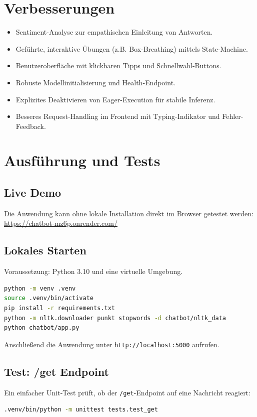 \documentclass[a4paper,11pt]{article}
\begin{document}
\section{Verbesserungen}
\begin{itemize}
  \item Sentiment-Analyse zur empathischen Einleitung von Antworten.
  \item Gef\"uhrte, interaktive \"Ubungen (z.B. Box-Breathing) mittels State-Machine.
  \item Benutzeroberfl\"ache mit klickbaren Tipps und Schnellwahl-Buttons.
  \item Robuste Modellinitialisierung und Health-Endpoint.
  \item Explizites Deaktivieren von Eager-Execution f\"ur stabile Inferenz.
  \item Besseres Request-Handling im Frontend mit Typing-Indikator und Fehler-Feedback.
\end{itemize}

\section{Ausf\"uhrung und Tests}
\subsection{Live Demo}
Die Anwendung kann ohne lokale Installation direkt im Browser getestet werden: \\
\href{https://chatbot-mz6p.onrender.com/}{https://chatbot-mz6p.onrender.com/}

\subsection{Lokales Starten}
Voraussetzung: Python 3.10 und eine virtuelle Umgebung.
\begin{lstlisting}[style=shared,language=bash]
python -m venv .venv
source .venv/bin/activate
pip install -r requirements.txt
python -m nltk.downloader punkt stopwords -d chatbot/nltk_data
python chatbot/app.py
\end{lstlisting}
Anschlie\ss end die Anwendung unter \texttt{http://localhost:5000} aufrufen.

\subsection{Test: /get Endpoint}
Ein einfacher Unit-Test pr\"uft, ob der \texttt{/get}-Endpoint auf eine Nachricht reagiert:
\begin{lstlisting}[style=shared,language=bash]
.venv/bin/python -m unittest tests.test_get
\end{lstlisting}
\end{document}
